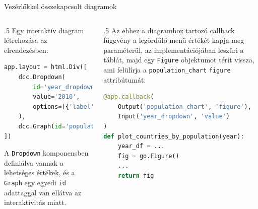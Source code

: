 \documentclass[english, aspectratio=169]{beamer}
\begin{document}
	\begin{frame}[fragile]{Vezérlőkkel összekapcsolt diagramok}
		\begin{columns}
			\begin{column}{.5\textwidth}
				Egy interaktív diagram létrehozása az elrendezésben:
				\begin{lstlisting}[language=python]
app.layout = html.Div([
	dcc.Dropdown(
		id='year_dropdown',
		value='2010',
		options=[{'label': year, 'value': str(year)} for year in range(1974, 2019)]
	),
	dcc.Graph(id='population_chart')
])
				\end{lstlisting}
				A \texttt{Dropdown} komponensben definiálva vannak a lehetséges értékek, és a \texttt{Graph} egy egyedi \texttt{id} adattaggal van ellátva az interaktivitás miatt.
			\end{column}
			\begin{column}{.5\textwidth}
				Az ehhez a diagramhoz tartozó callback függvény a legördülő menü értékét kapja meg paraméterül, az implementációjában leszűri a táblát, majd egy \texttt{Figure} objektumot térít vissza, ami felülírja a \texttt{population\_chart} \texttt{figure} attribútumát:
				\begin{lstlisting}[language=python]
@app.callback(
	Output('population_chart', 'figure'),
	Input('year_dropdown', 'value')
)
def plot_countries_by_population(year):
	year_df = ...
	fig = go.Figure()
	...
	return fig
				\end{lstlisting}
			\end{column}
		\end{columns}
	\end{frame}
	
\end{document}
